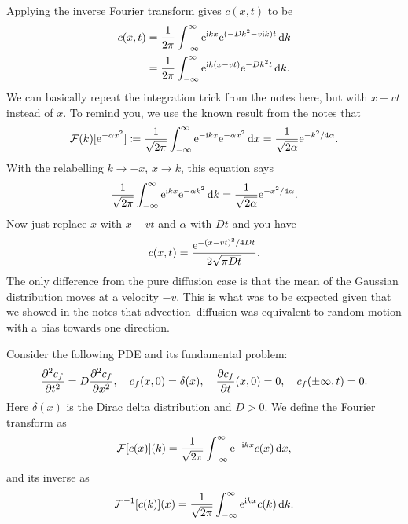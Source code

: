 \documentclass[a4paper, 12pt]{article}
\begin{document}
\begin{enumerate}[label={\bf \arabic{*}.\;}, ref={\arabic{*}},itemsep=3ex, left=0ex]
{\begin{enumerate}[label=(\roman*)]
{            Applying the inverse Fourier transform gives $c(x,t)$ to be
            \begin{align}
              c(x,t) &= \frac{1}{2\pi}\int_{-\infty}^{\infty}\mathrm{e} ^{\mathrm{i} kx}\mathrm{e} ^{ (-D k^2 -v\mathrm{i} {k})t}\,{\mathrm d}{k} \\
              & = \frac{1}{2\pi}\int_{-\infty}^{\infty}\mathrm{e} ^{\mathrm{i} k(x-vt)}\mathrm{e} ^{ -D k^2 t}\,{\mathrm d}{k}.
            \end{align}
            We can basically repeat the integration trick from the notes here, but with $x-vt$ instead of $x$. To remind you, we use the known result from the notes that
            \begin{equation}
              \mathcal{F}(k)[\mathrm{e}^{-\alpha x^2}] \coloneqq \frac{1}{\sqrt{2\pi}}\int^\infty_{-\infty} \mathrm{e}^{-\mathrm{i} k x} \mathrm{e}^{-\alpha x^2} \, {\mathrm d} x = \frac{1}{\sqrt{2\alpha}}\mathrm{e}^{-k^2/4\alpha}.
            \end{equation}
            With the relabelling $k\to-x$, $x\to k$, this equation says
            \begin{equation}
              \frac{1}{\sqrt{2\pi}}\int^\infty_{-\infty} \mathrm{e}^{\mathrm{i} k x} \mathrm{e}^{-\alpha k^2} \, {\mathrm d} k = \frac{1}{\sqrt{2\alpha}}\mathrm{e}^{-x^2/4\alpha}.
            \end{equation}
            Now just replace $x$ with $x-vt$ and $\alpha$ with $Dt$ and you have
            \begin{equation}
              c(x,t) = \frac{\mathrm{e} ^{-(x-vt)^2/4Dt}}{2\sqrt{\pi D t}}.
            \end{equation}
            The only difference from the pure diffusion case is that the mean of the Gaussian distribution moves at a velocity $-v$. This is what was to be expected given that we showed in the notes that advection--diffusion was equivalent to random motion with a bias towards one direction.
          }
      \end{enumerate}

    }


    {
      Consider the following PDE and its fundamental problem:
      \begin{equation}
        \label{prob1}
        \pdd{c_f}{t} = D\pdd{c_f}{x},\quad c_f(x,0) =\delta(x),\quad \pd{c_f}{t}(x,0) = 0,\quad c_f(\pm\infty,t) = 0.
      \end{equation}
      Here $\delta(x)$ is the Dirac delta distribution and $D>0$. We define the Fourier transform as
      \begin{align}
        \mathcal{F}[c(x)](k)= \frac{1}{\sqrt{2\pi}}\int_{-\infty}^{\infty}\mathrm{e} ^{-\mathrm{i} k x}c(x)\,{\mathrm d}{x},
      \end{align}
      and its inverse as
      \begin{align}
        \mathcal{F}^{-1}[c(k)](x)= \frac{1}{\sqrt{2\pi}}\int_{-\infty}^{\infty}\mathrm{e} ^{\mathrm{i} k x}c(k)\,{\mathrm d}{k}.
      \end{align}

}
\end{enumerate}
\end{document}
